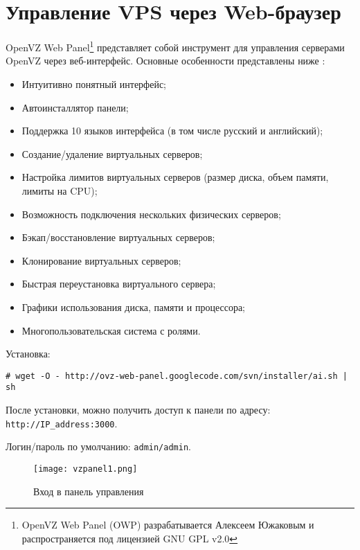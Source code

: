 \section{Управление VPS через Web-браузер}

OpenVZ Web Panel\footnote{OpenVZ Web Panel (OWP) разрабатывается Алексеем Южаковым и распространяется под лицензией GNU GPL v2.0}
представляет собой инструмент для управления серверами OpenVZ через веб-интерфейс. 
Основные особенности представлены ниже \cite{vzpanel}:
\begin{itemize}
    \item Интуитивно понятный интерфейс;
    \item Автоинсталлятор панели;
    \item Поддержка 10 языков интерфейса (в том числе русский и английский);
    \item Создание/удаление виртуальных серверов;
    \item Настройка лимитов виртуальных серверов (размер диска, объем памяти, лимиты на CPU);
    \item Возможность подключения нескольких физических серверов;
    \item Бэкап/восстановление виртуальных серверов;
    \item Клонирование виртуальных серверов;
    \item Быстрая переустановка виртуального сервера;
    \item Графики использования диска, памяти и процессора;
    \item Многопользовательская система с ролями.
\end{itemize}

Установка:
\begin{lstlisting}
# wget -O - http://ovz-web-panel.googlecode.com/svn/installer/ai.sh | sh
\end{lstlisting}

После установки, можно получить доступ к панели по адресу: \\
\texttt{http://IP\_address:3000}.

Логин/пароль по умолчанию: \texttt{admin/admin}.

\begin{figure}[ht]
	\begin{center}
	 	\texttt{[image: vzpanel1.png]}
	 	\caption{Вход в панель управления}\label{pic:vzpanel1}
	 \end{center}
\end{figure}

